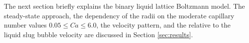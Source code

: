 \documentclass[preprint,12pt]{elsarticle}
\begin{document}


The next section briefly explains the binary liquid lattice Boltzmann model.
The steady-state approach, the dependency of the radii on the moderate capillary number values
$0.05\leq Ca \leq 6.0$, the velocity pattern, and the relative to the liquid slug bubble velocity 
are discussed in Section
\ref{sec:results}. 
\end{document}
